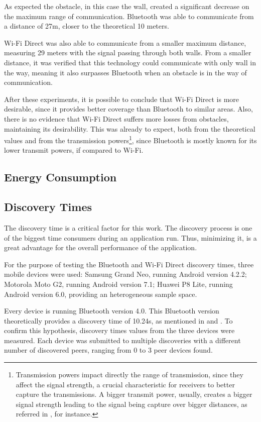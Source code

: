 As expected the obstacle, in this case the wall, created a significant decrease on the maximum range of communication. Bluetooth was able to communicate from a distance of 27m, closer to the theoretical 10 meters.

Wi-Fi Direct was also able to communicate from a smaller maximum distance, measuring 29 meters with the signal passing through both walls. From a smaller distance, it was verified that this technology could communicate with only wall in the way, meaning it also surpasses Bluetooth when an obstacle is in the way of communication.

After these experiments, it is possible to conclude that Wi-Fi Direct is more desirable, since it provides better coverage than Bluetooth to similar areas. Also, there is no evidence that Wi-Fi Direct suffers more losses from obstacles, maintaining its desirability. This was already to expect, both from the theoretical values and from the transmission powers\footnote{Transmission powers impact directly the range of transmission, since they affect the signal strength, a crucial characteristic for receivers to better capture the transmissions. A bigger transmit power, usually, creates a bigger signal strength leading to the signal being capture over bigger distances, as referred in \cite{txpower}, for instance.}, since Bluetooth is mostly known for its lower transmit powers, if compared to Wi-Fi.

\subsection{Energy Consumption}

\subsection{Discovery Times}
\label{subsec:normaldisc}

The discovery time is a critical factor for this work. The discovery process is one of the biggest time consumers during an application run. Thus, minimizing it, is a great advantage for the overall performance of the application.

For the purpose of testing the Bluetooth and Wi-Fi Direct discovery times, three mobile devices were used: Samsung Grand Neo, running Android version 4.2.2; Motorola Moto G2, running Android version 7.1; Huawei P8 Lite, running Android version 6.0, providing an heterogeneous sample space.

Every device is running Bluetooth version 4.0. This Bluetooth version theoretically provides a discovery time of 10.24s, as mentioned in \cite{btdisc1} and \cite{btdisc2}. To confirm this hypothesis, discovery times values from the three devices were measured. Each device was submitted to multiple discoveries with a different number of discovered peers, ranging from 0 to 3 peer devices found.

